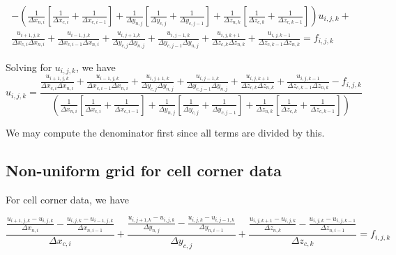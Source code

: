 \documentclass[landscape,11pt]{article}
\begin{document}
\begin{multline}
	-\left(
	\frac{ 1 }{ \Delta x_{n,i} }
	\left[
	\frac{ 1 }{ \Delta x_{c,i} } +
	\frac{ 1 }{ \Delta x_{c,i-1} }
	\right] +
	\frac{ 1 }{ \Delta y_{n,j} }
	\left[
	\frac{ 1 }{ \Delta y_{c,j} } +
	\frac{ 1 }{ \Delta y_{c,j-1} }
	\right] +
	\frac{ 1 }{ \Delta z_{n,k} }
	\left[
	\frac{ 1 }{ \Delta z_{c,k} } +
	\frac{ 1 }{ \Delta z_{c,k-1} }
	\right]
	\right) u_{i,j,k}
	+ \\
	\frac{u_{i+1,j,k}}{\Delta x_{c,i} \Delta x_{n,i}} + \frac{u_{i-1,j,k}}{\Delta x_{c,i-1} \Delta x_{n,i}} +
	\frac{u_{i,j+1,k}}{\Delta y_{c,j} \Delta y_{n,j}} + \frac{u_{i,j-1,k}}{\Delta y_{c,j-1} \Delta y_{n,j}} +
	\frac{u_{i,j,k+1}}{\Delta z_{c,k} \Delta z_{n,k}} + \frac{u_{i,j,k-1}}{\Delta z_{c,k-1} \Delta z_{n,k}} = f_{i,j,k}
\end{multline}

Solving for $u_{i,j,k}$, we have
\begin{equation}
	u_{i,j,k} =
	\frac{
	\frac{u_{i+1,j,k}}{\Delta x_{c,i} \Delta x_{n,i}} + \frac{u_{i-1,j,k}}{\Delta x_{c,i-1} \Delta x_{n,i}} +
	\frac{u_{i,j+1,k}}{\Delta y_{c,j} \Delta y_{n,j}} + \frac{u_{i,j-1,k}}{\Delta y_{c,j-1} \Delta y_{n,j}} +
	\frac{u_{i,j,k+1}}{\Delta z_{c,k} \Delta z_{n,k}} + \frac{u_{i,j,k-1}}{\Delta z_{c,k-1} \Delta z_{n,k}}
	- f_{i,j,k} }{
	\left(
	\frac{ 1 }{ \Delta x_{n,i} }
	\left[
	\frac{ 1 }{ \Delta x_{c,i} } +
	\frac{ 1 }{ \Delta x_{c,i-1} }
	\right] +
	\frac{ 1 }{ \Delta y_{n,j} }
	\left[
	\frac{ 1 }{ \Delta y_{c,j} } +
	\frac{ 1 }{ \Delta y_{c,j-1} }
	\right] +
	\frac{ 1 }{ \Delta z_{n,k} }
	\left[
	\frac{ 1 }{ \Delta z_{c,k} } +
	\frac{ 1 }{ \Delta z_{c,k-1} }
	\right]
	\right)
	}
\end{equation}

We may compute the denominator first since all terms are divided by this.


\subsection{Non-uniform grid for cell corner data}

For cell corner data, we have

\begin{equation}
	\frac{\frac{u_{i+1,j,k}-u_{i,j,k}}{\Delta x_{n,i}} - \frac{u_{i,j,k}-u_{i-1,j,k}}{\Delta x_{n,i-1}}}{\Delta x_{c,i}} +
	\frac{\frac{u_{i,j+1,k}-u_{i,j,k}}{\Delta y_{n,j}} - \frac{u_{i,j,k}-u_{i,j-1,k}}{\Delta y_{n,i-1}}}{\Delta y_{c,j}} +
	\frac{\frac{u_{i,j,k+1}-u_{i,j,k}}{\Delta z_{n,k}} - \frac{u_{i,j,k}-u_{i,j,k-1}}{\Delta z_{n,i-1}}}{\Delta z_{c,k}} = f_{i,j,k}
\end{equation}
\end{document}
